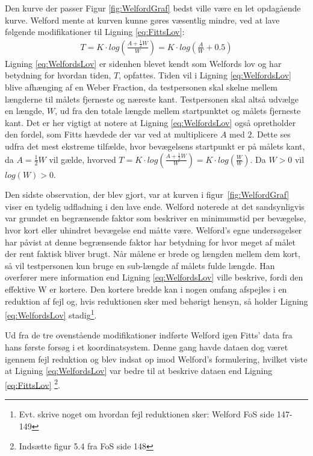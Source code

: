 Den kurve der passer Figur \ref{fig:WelfordGraf} bedst ville være en let opdagående kurve. Welford mente at kurven kunne gøres væsentlig mindre, ved at lave følgende modifikationer til Ligning \ref{eq:FittsLov}:
\begin{align}\label{eq:WelfordsLov}
T = K \cdot log\left(\frac{A + \frac{1}{2}W}{W}\right) = K \cdot log\left(\frac{A}{W} + 0.5\right)
\end{align}
Ligning \ref{eq:WelfordsLov} er sidenhen blevet kendt som Welfords lov og har betydning for hvordan tiden, $T$, opfattes. Tiden vil i Ligning \ref{eq:WelfordsLov} blive afhænging af en Weber Fraction, da testpersonen skal skelne mellem længderne til målets fjerneste og næreste kant. Testpersonen skal altså udvælge en længde, $W$, ud fra den totale længde mellem startpunktet og målets fjerneste kant. Det er her vigtigt at notere at Ligning \ref{eq:WelfordsLov} også opretholder den fordel, som Fitts hævdede der var ved at multiplicere $A$ med $2$. Dette ses udfra det mest ekstreme tilfælde, hvor bevægelsens startpunkt er på målets kant, da $A = \frac{1}{2}W$ vil gælde, hvorved $T = K \cdot log\left(\frac{A + \frac{1}{2}W}{W}\right) = K \cdot log\left(\frac{W}{W}\right)$. Da $W > 0$ vil $log(W) > 0$.

Den sidste observation, der blev gjort, var at kurven i figur~\ref{fig:WelfordGraf} viser en tydelig udfladning i den lave ende. Welford noterede at det sandsynligvis var grundet en begrænsende faktor som beskriver en minimumstid per bevægelse, hvor kort eller uhindret bevægelse end måtte være. Welford's egne undersøgelser har påvist at denne begrænsende faktor har betydning for hvor meget af målet der rent faktisk bliver brugt. Når målene er brede og længden mellem dem kort, så vil testpersonen kun bruge en sub-længde af målets fulde længde. Han overfører mere information end Ligning \ref{eq:WelfordsLov} ville beskrive, fordi den effektive W er kortere. Den kortere bredde kan i nogen omfang afspejles i en reduktion af fejl og, hvis reduktionen sker med behørigt hensyn, så holder Ligning \ref{eq:WelfordsLov} stadig\footnote{Evt. skrive noget om hvordan fejl reduktionen sker: Welford FoS side 147-149}.

Ud fra de tre ovenstående modifikationer indførte Welford igen Fitts' data fra hans første forsøg i et koordinatsystem. Denne gang havde dataen dog været igennem fejl reduktion og blev indsat op imod Welford's formulering, hvilket viste at Ligning \ref{eq:WelfordsLov} var bedre til at beskrive dataen end Ligning \ref{eq:FittsLov} \footnote{Indsætte figur 5.4 fra FoS side 148}.

